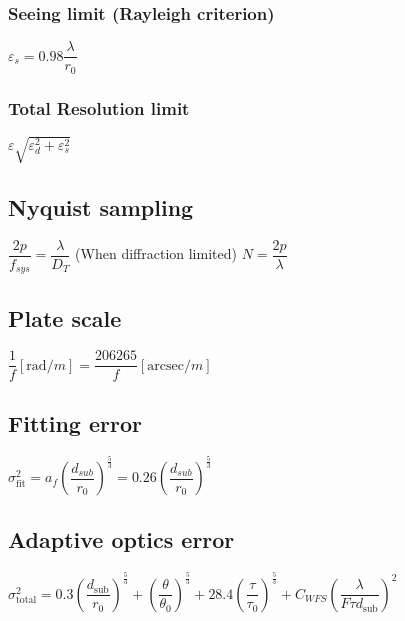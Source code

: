 \subsubsection{Seeing limit (Rayleigh criterion)}			
\begin{itemize}
\itemt \( \varepsilon_s = 0.98 \dfrac{\lambda}{r_0} \)
\end{itemize}

\subsubsection{Total Resolution limit}			
\begin{itemize}
\itemt \( \varepsilon \sqrt{\varepsilon_d^2 + \varepsilon_s^2} \)
\end{itemize}

\subsection{Nyquist sampling}		
\begin{itemize}
\itemt \( \dfrac{2p}{f_{sys}} = \dfrac{\lambda}{D_T} \) \tab (When diffraction limited)
\itemt \( N = \dfrac{2p}{\lambda} \)
\end{itemize}			

\subsection{Plate scale}		
\begin{itemize}
\itemt \( \dfrac{1}{f} [\mathrm{rad}/m] = \dfrac{206265}{f} [\mathrm{arcsec}/m] \)
\end{itemize}

\subsection{Fitting error}		
\begin{itemize}
\itemt \( \sigma_\mathrm{fit}^2 = a_f (\dfrac{d_{sub}}{r_0})^{\frac{5}{3}} = 0.26 (\dfrac{d_{sub}}{r_0})^{\frac{5}{3}} \)
\end{itemize}

\subsection{Adaptive optics error}
\begin{itemize}
\itemt \( \sigma_\mathrm{total}^2 = 0.3(\dfrac{d_\mathrm{sub}}{r_0})^{\frac{5}{3}} + (\dfrac{\theta}{\theta_0})^{\frac{5}{3}} + 28.4(\dfrac{\tau}{\tau_0})^{\frac{5}{3}} + C_{WFS} (\dfrac{\lambda}{F\tau d_\mathrm{sub}})^2 \)
\end{itemize}
		 
